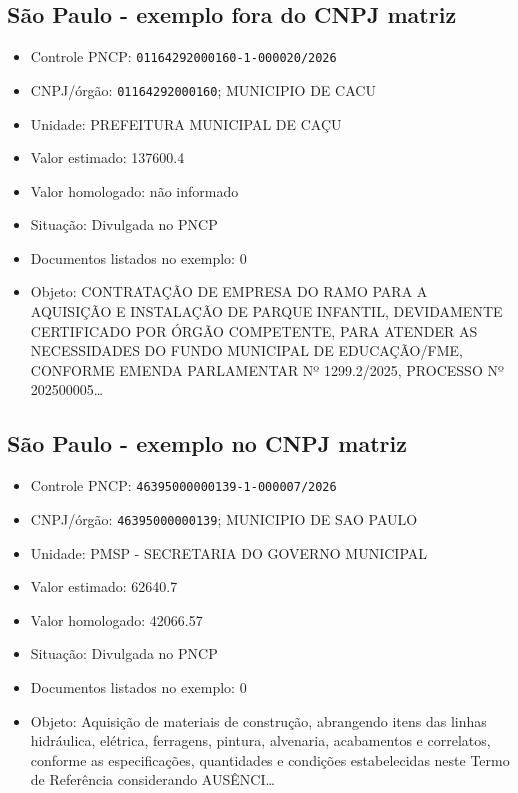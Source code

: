 \documentclass[12pt]{article}
\providecommand{\tightlist}{%
  \setlength{\itemsep}{0pt}\setlength{\parskip}{0pt}}
\begin{document}
\subsection{São Paulo - exemplo fora do CNPJ
matriz}\label{sao-paulo---exemplo-fora-do-cnpj-matriz}

\begin{itemize}
\tightlist
\item
  Controle PNCP: \texttt{01164292000160-1-000020/2026}
\item
  CNPJ/órgão: \texttt{01164292000160}; MUNICIPIO DE CACU
\item
  Unidade: PREFEITURA MUNICIPAL DE CAÇU
\item
  Valor estimado: 137600.4
\item
  Valor homologado: não informado
\item
  Situação: Divulgada no PNCP
\item
  Documentos listados no exemplo: 0
\item
  Objeto: CONTRATAÇÃO DE EMPRESA DO RAMO PARA A AQUISIÇÃO E INSTALAÇÃO
  DE PARQUE INFANTIL, DEVIDAMENTE CERTIFICADO POR ÓRGÃO COMPETENTE, PARA
  ATENDER AS NECESSIDADES DO FUNDO MUNICIPAL DE EDUCAÇÃO/FME, CONFORME
  EMENDA PARLAMENTAR Nº 1299.2/2025, PROCESSO Nº 202500005\ldots{}
\end{itemize}

\subsection{São Paulo - exemplo no CNPJ
matriz}\label{sao-paulo---exemplo-no-cnpj-matriz}

\begin{itemize}
\tightlist
\item
  Controle PNCP: \texttt{46395000000139-1-000007/2026}
\item
  CNPJ/órgão: \texttt{46395000000139}; MUNICIPIO DE SAO PAULO
\item
  Unidade: PMSP - SECRETARIA DO GOVERNO MUNICIPAL
\item
  Valor estimado: 62640.7
\item
  Valor homologado: 42066.57
\item
  Situação: Divulgada no PNCP
\item
  Documentos listados no exemplo: 0
\item
  Objeto: Aquisição de materiais de construção, abrangendo itens das
  linhas hidráulica, elétrica, ferragens, pintura, alvenaria,
  acabamentos e correlatos, conforme as especificações, quantidades e
  condições estabelecidas neste Termo de Referência considerando
  AUSÊNCI\ldots{}
\end{itemize}
\end{document}
